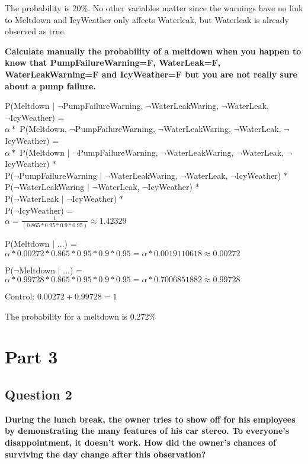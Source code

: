 \documentclass[12pt,a4paper]{article}
\begin{document}
The probability is 20\%. No other variables matter since the warnings have no link to Meltdown and IcyWeather only affects Waterleak, but Waterleak is already observed as true.

\textbf{Calculate manually the probability of a meltdown when you happen to know that PumpFailureWarning=F, WaterLeak=F, WaterLeakWarning=F and IcyWeather=F but you are not really sure about a pump failure.}

P(Meltdown $|$ $\lnot$PumpFailureWarning, $\lnot$WaterLeakWaring, $\lnot$WaterLeak, \\ $\lnot$IcyWeather) = \\
$\alpha *$ P(Meltdown, $\lnot$PumpFailureWarning, $\lnot$WaterLeakWaring, $\lnot$WaterLeak, $\lnot$IcyWeather) = \\
$\alpha *$ P(Meltdown $|$ $\lnot$PumpFailureWarning, $\lnot$WaterLeakWaring, $\lnot$WaterLeak, $\lnot$IcyWeather) $*$ \\ P($\lnot$PumpFailureWarning $|$ $\lnot$WaterLeakWaring, $\lnot$WaterLeak, $\lnot$IcyWeather) $*$ \\ P($\lnot$WaterLeakWaring $|$ $\lnot$WaterLeak, $\lnot$IcyWeather) $*$ \\ P($\lnot$WaterLeak $|$ $\lnot$IcyWeather) $*$ \\ P($\lnot$IcyWeather) = \\

$\alpha = \frac{1}{(0.865 * 0.95 * 0.9 * 0.95)} \approx 1.42329$

P(Meltdown $|$ ...) = $\alpha * 0.00272 * 0.865 * 0.95 * 0.9 * 0.95 = \alpha * 0.0019110618 \approx 0.00272$

P($\lnot$Meltdown $|$ ...) = $\alpha * 0.99728 * 0.865 * 0.95 * 0.9 * 0.95 = \alpha * 0.7006851882 \approx 0.99728$

Control: $0.00272 + 0.99728 = 1$ %

The probability for a meltdown is 0.272\%

\section {Part 3}
\subsection{Question 2}
\textbf{During the lunch break, the owner tries to show off for his employees by demonstrating the many features of his car stereo. To everyone's disappointment, it doesn't work. How did the owner's chances of surviving the day change after this observation?}
\end{document}
